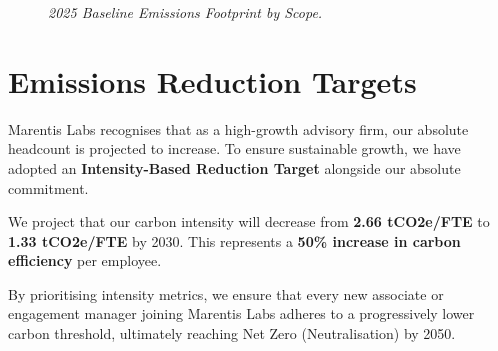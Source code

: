 \documentclass[11pt, a4paper]{article}
\begin{document}
\begin{figure}[H]
    \centering
    \vspace{-0.5em}
    \caption{\small \textit{2025 Baseline Emissions Footprint by Scope.}}
\end{figure}

\section{Emissions Reduction Targets}
\label{sec:reduction_targets}

Marentis Labs recognises that as a high-growth advisory firm, our absolute headcount is projected to increase. To ensure sustainable growth, we have adopted an \textbf{Intensity-Based Reduction Target} alongside our absolute commitment.

We project that our carbon intensity will decrease from \textbf{2.66 tCO2e/FTE} to \textbf{1.33 tCO2e/FTE} by 2030. This represents a \textbf{50\% increase in carbon efficiency} per employee.

By prioritising intensity metrics, we ensure that every new associate or engagement manager joining Marentis Labs adheres to a progressively lower carbon threshold, ultimately reaching Net Zero (Neutralisation) by 2050.
\end{document}
